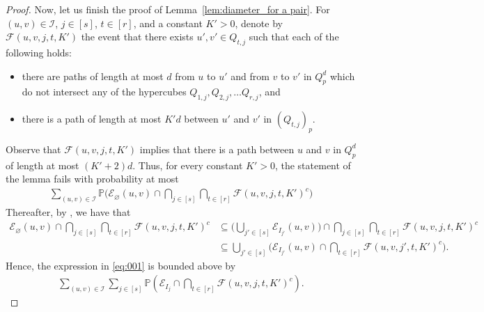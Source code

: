 \documentclass[reqno,final,a4paper]{amsart}
\theoremstyle{definition}
\newcommand{\cE}{\mathcal{E}}
\newcommand{\cF}{\mathcal{F}}
\newcommand{\cI}{\mathcal{I}}
\newcommand{\1}{\mathbbm{1}}
\begin{document}
\begin{proof}
Now, let us finish the proof of Lemma~\ref{lem:diameter_for a pair}. For $(u,v)\in \cI$, $j\in [s]$, $t\in [r]$, and a constant $K'>0$, denote by $\cF(u,v,j,t,K')$ the event that there exists $u',v'\in Q_{t,j}$ such that each of the following holds:
\begin{itemize}
    \item there are paths of length at most $d$ from $u$ to $u'$ and from $v$ to $v'$ in $Q^d_p$ which do not intersect any of the hypercubes $Q_{1,j},Q_{2,j},\ldots Q_{r,j}$, and
    \item there is a path of length at most $K'd$ between $u'$ and $v'$ in $(Q_{t,j})_p$.
\end{itemize}
Observe that $\cF(u,v,j,t,K')$ implies that there is a path between $u$ and $v$ in $Q^d_p$ of length at most $(K'+2)d$. Thus, for every constant $K'>0$,
the statement of the lemma fails with probability at most 
\begin{align}\label{eq:001}
    \sum_{(u,v)\in \cI}  \mathbb{P}\bigg(\cE_{\varnothing}(u,v)\cap \bigcap_{j\in [s]} \bigcap_{t\in[r]}\cF(u,v,j,t,K')^c\bigg)
\end{align}
Thereafter, by , we have that
\begin{align*}
\cE_{\varnothing}(u,v)\cap \bigcap_{j\in [s]} \bigcap_{t\in[r]}\cF(u,v,j,t,K')^c
&\subseteq \bigg(\bigcup_{j'\in [s]}\cE_{I_{j'}}(u,v)\bigg)\cap \bigcap_{j\in [s]} \bigcap_{t\in[r]}\cF(u,v,j,t,K')^c\\
&\subseteq \bigcup_{j'\in [s]}\bigg(\cE_{I_{j'}}(u,v)\cap  \bigcap_{t\in[r]}\cF(u,v,j',t,K')^c  \bigg).
\end{align*}
Hence, the expression in \eqref{eq:001} is bounded above by 
\begin{align}\label{eq:002}
    \sum_{(u,v)\in \cI}  \sum_{j\in[s]}\mathbb{P}\left(\cE_{I_j}\cap \bigcap_{t\in[r]}\cF(u,v,j,t,K')^c\right).
\end{align}


\end{proof}
\end{document}
